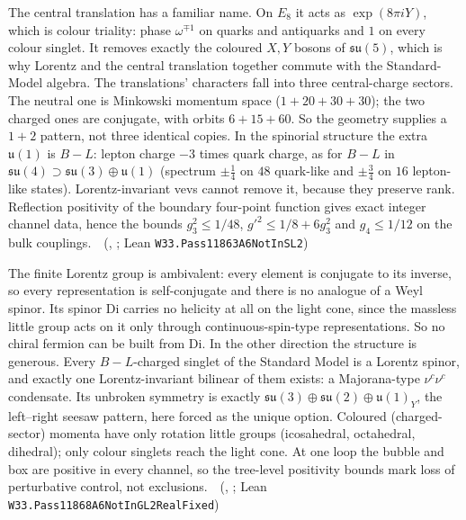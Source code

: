 The central translation has a familiar name. On $E_8$ it acts as $\exp(8\pi i Y)$, which is colour triality: phase $\omega^{\mp1}$
on quarks and antiquarks and $1$ on every colour singlet. It removes exactly the coloured $X,Y$ bosons of $\mathfrak{su}(5)$, which
is why Lorentz and the central translation together commute with the Standard-Model algebra. The translations' characters fall
into three central-charge sectors. The neutral one is Minkowski momentum space ($1+20+30+30$); the two charged ones are conjugate,
with orbits $6+15+60$. So the geometry supplies a $1+2$ pattern, not three identical copies. In the spinorial structure the extra
$\mathfrak u(1)$ is $B-L$: lepton charge $-3$ times quark charge, as for $B-L$ in $\mathfrak{su}(4)\supset\mathfrak{su}(3)\oplus\mathfrak u(1)$ (spectrum $\pm\tfrac14$ on $48$ quark-like and $\pm\tfrac34$ on $16$ lepton-like states). Lorentz-invariant vevs cannot remove it, because they preserve
rank. Reflection positivity of the boundary four-point function gives exact integer channel data, hence the bounds
$g_3^2\le1/48$, $g'^2\le1/8+6g_3^2$ and $g_4\le1/12$ on the bulk couplings.
\tierT\,\tierC\ (, ; Lean \texttt{W33.Pass11863A6NotInSL2})

The finite Lorentz group is ambivalent: every element is conjugate to its inverse, so every representation is self-conjugate and
there is no analogue of a Weyl spinor. Its spinor Di carries no helicity at all on the light cone, since the massless little group
acts on it only through continuous-spin-type representations. So no chiral fermion can be built from Di. In the other direction
the structure is generous. Every $B-L$-charged singlet of the Standard Model is a Lorentz spinor, and exactly one Lorentz-invariant
bilinear of them exists: a Majorana-type $\nu^c\nu^c$ condensate. Its unbroken symmetry is exactly $\mathfrak{su}(3)\oplus\mathfrak{su}(2)
\oplus\mathfrak u(1)_Y$, the left--right seesaw pattern, here forced as the unique option. Coloured (charged-sector) momenta have only
rotation little groups (icosahedral, octahedral, dihedral); only colour singlets reach the light cone. At one loop the bubble and box
are positive in every channel, so the tree-level positivity bounds mark loss of perturbative control, not exclusions.
\tierT\,\tierC\ (, ; Lean \texttt{W33.Pass11868A6NotInGL2RealFixed})

